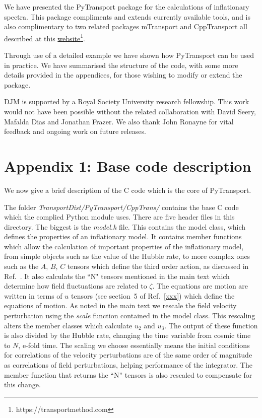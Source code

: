 \documentclass[10pt,
amsmath,amssymb,
aps,prd,nofootinbib,eqsecnum,a4paper]{revtex4}
\newcommand{\CC}{C\nolinebreak\hspace{-.05em}\raisebox{.4ex}{\tiny\bf +}\nolinebreak\hspace{-.10em}\raisebox{.4ex}{\tiny\bf +}}
\def\CC{{C\nolinebreak[4]\hspace{-.05em}\raisebox{.4ex}{\tiny\bf ++}}}
\def\S{ }
\begin{document}
We have presented the PyTransport package for the calculations of inflationary spectra. This package 
compliments and extends currently available tools, and is also complimentary to two related packages 
mTransport \cite{Dias:2015rca} and CppTransport \cite{xxx,xxx2}  all described at this \href{https://transportmethod.com}{website}\footnote{https://transportmethod.com}.

Through use of a detailed example we have shown how PyTransport can be used in practice. We have summarised the structure of 
the code, with some more details provided in the appendices, for those wishing to 
modify or extend the package. 

\begin{acknowledgments}
DJM is supported by a Royal Society University research fellowship. This work would not have been possible without 
the related collaboration with David Seery, Mafalda Dias and Jonathan Frazer. We also thank John Ronayne for vital feedback and ongoing work on future releases.
\end{acknowledgments}


\section*{Appendix 1:  Base code description}
We now give a brief description of the \CC \S  code which is the core of PyTransport. 

The folder  {\it TransportDist/PyTransport/CppTrans/} contains the base \CC \S code which the complied Python module uses.
There are  five header files in this directory. The biggest is the {\it model.h} file. This contains the model class, which 
defines the properties of an inflationary model. It contains member functions which allow the calculation of important 
properties of the inflationary model, from simple objects such as the value of the Hubble rate, to more complex ones such 
as the 
$A$, $B$, $C$ tensors which define the third order action, as discussed in Ref.~\cite{xxx}. It also calculats the ``N" tensors 
mentioned in the main text
which determine how field fluctuations are related to $\zeta$. 
The equations are motion are written in terms of $u$ tensors (see section~5 of Ref.~\ref{xxx}) which define the 
equations of motion. As noted in the main text 
we rescale the field velocity perturbation using the {\it scale} function contained in the model class. This rescaling alters the 
member classes which calculate $u_2$ and $u_3$. The output of these function is also divided by the Hubble rate, changing the 
time variable from cosmic time to $N$, e-fold time.  The scaling we choose essentially means the initial conditions for 
correlations of the velocity perturbations
are of the same order of magnitude as correlations of field perturbations, helping performance of the integrator. 
The member function that returns the ``N'' tensors is also rescaled to compensate for this change.
\end{document}
